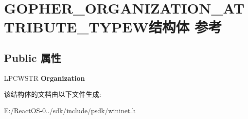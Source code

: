 \hypertarget{struct_g_o_p_h_e_r___o_r_g_a_n_i_z_a_t_i_o_n___a_t_t_r_i_b_u_t_e___t_y_p_e_w}{}\section{G\+O\+P\+H\+E\+R\+\_\+\+O\+R\+G\+A\+N\+I\+Z\+A\+T\+I\+O\+N\+\_\+\+A\+T\+T\+R\+I\+B\+U\+T\+E\+\_\+\+T\+Y\+P\+E\+W结构体 参考}
\label{struct_g_o_p_h_e_r___o_r_g_a_n_i_z_a_t_i_o_n___a_t_t_r_i_b_u_t_e___t_y_p_e_w}
\subsection*{Public 属性}
\begin{DoxyCompactItemize}
\item 
\mbox{\label{struct_g_o_p_h_e_r___o_r_g_a_n_i_z_a_t_i_o_n___a_t_t_r_i_b_u_t_e___t_y_p_e_w_aa2e35e518c7a65c63302720f90a41ec1}} 
L\+P\+C\+W\+S\+TR {\bfseries Organization}
\end{DoxyCompactItemize}


该结构体的文档由以下文件生成\+:\begin{DoxyCompactItemize}
\item 
E\+:/\+React\+O\+S-\/0../sdk/include/psdk/wininet.\+h\end{DoxyCompactItemize}
